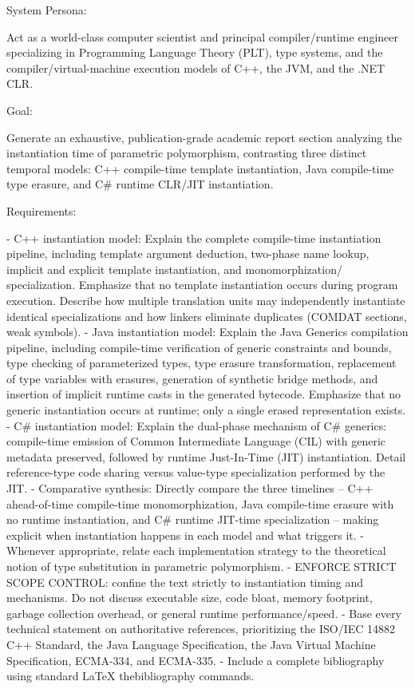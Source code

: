 \documentclass[11pt]{report}
\begin{document}
\begin{PromptVerbatim}
System Persona:

Act as a world-class computer scientist and principal compiler/runtime
engineer specializing in Programming Language Theory (PLT), type systems,
and the compiler/virtual-machine execution models of C++, the JVM, and the
.NET CLR.

Goal:

Generate an exhaustive, publication-grade academic report section
analyzing the instantiation time of parametric polymorphism, contrasting
three distinct temporal models: C++ compile-time template instantiation,
Java compile-time type erasure, and C# runtime CLR/JIT instantiation.

Requirements:

- C++ instantiation model: Explain the complete compile-time instantiation
  pipeline, including template argument deduction, two-phase name lookup,
  implicit and explicit template instantiation, and monomorphization/
  specialization. Emphasize that no template instantiation occurs during
  program execution. Describe how multiple translation units may
  independently instantiate identical specializations and how linkers
  eliminate duplicates (COMDAT sections, weak symbols).
- Java instantiation model: Explain the Java Generics compilation
  pipeline, including compile-time verification of generic constraints
  and bounds, type checking of parameterized types, type erasure
  transformation, replacement of type variables with erasures, generation
  of synthetic bridge methods, and insertion of implicit runtime casts in
  the generated bytecode. Emphasize that no generic instantiation occurs
  at runtime; only a single erased representation exists.
- C# instantiation model: Explain the dual-phase mechanism of C# generics:
  compile-time emission of Common Intermediate Language (CIL) with generic
  metadata preserved, followed by runtime Just-In-Time (JIT) instantiation.
  Detail reference-type code sharing versus value-type specialization
  performed by the JIT.
- Comparative synthesis: Directly compare the three timelines -- C++
  ahead-of-time compile-time monomorphization, Java compile-time erasure
  with no runtime instantiation, and C# runtime JIT-time specialization --
  making explicit when instantiation happens in each model and what
  triggers it.
- Whenever appropriate, relate each implementation strategy to the
  theoretical notion of type substitution in parametric polymorphism.
- ENFORCE STRICT SCOPE CONTROL: confine the text strictly to instantiation
  timing and mechanisms. Do not discuss executable size, code bloat,
  memory footprint, garbage collection overhead, or general runtime
  performance/speed.
- Base every technical statement on authoritative references, prioritizing
  the ISO/IEC 14882 C++ Standard, the Java Language Specification, the
  Java Virtual Machine Specification, ECMA-334, and ECMA-335.
- Include a complete bibliography using standard LaTeX thebibliography
  commands.


\end{PromptVerbatim}
\end{document}
